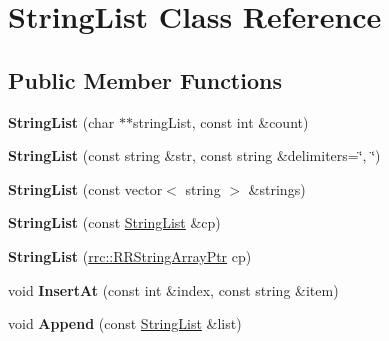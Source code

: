 \hypertarget{classrrc_1_1_string_list}{\section{String\+List Class Reference}
\label{classrrc_1_1_string_list}
}
\subsection*{Public Member Functions}
\begin{DoxyCompactItemize}
\item 
\hypertarget{classrrc_1_1_string_list_ae1e0bca30bc21edd66e7dd2b539273f4}{{\bfseries String\+List} (char $\ast$$\ast$string\+List, const int \&count)}\label{classrrc_1_1_string_list_ae1e0bca30bc21edd66e7dd2b539273f4}

\item 
\hypertarget{classrrc_1_1_string_list_a6306d63c1e79ab13cb62c1937722a06f}{{\bfseries String\+List} (const string \&str, const string \&delimiters=\char`\"{}, \char`\"{})}\label{classrrc_1_1_string_list_a6306d63c1e79ab13cb62c1937722a06f}

\item 
\hypertarget{classrrc_1_1_string_list_aec20e4743e6cebb9a3c14f04eee6ea5b}{{\bfseries String\+List} (const vector$<$ string $>$ \&strings)}\label{classrrc_1_1_string_list_aec20e4743e6cebb9a3c14f04eee6ea5b}

\item 
\hypertarget{classrrc_1_1_string_list_a2c6607735f8c410ce3ab82c1b88fc6f7}{{\bfseries String\+List} (const \hyperlink{classrrc_1_1_string_list}{String\+List} \&cp)}\label{classrrc_1_1_string_list_a2c6607735f8c410ce3ab82c1b88fc6f7}

\item 
\hypertarget{classrrc_1_1_string_list_a6dcfcea51506e87c9bbb2cf3f65751f7}{{\bfseries String\+List} (\hyperlink{rrc__types_8h_a7c9475df6c7337d99482b13a365e7596}{rrc\+::\+R\+R\+String\+Array\+Ptr} cp)}\label{classrrc_1_1_string_list_a6dcfcea51506e87c9bbb2cf3f65751f7}

\item 
\hypertarget{classrrc_1_1_string_list_ac3831ed58535977c2188dff41fbd2bcd}{void {\bfseries Insert\+At} (const int \&index, const string \&item)}\label{classrrc_1_1_string_list_ac3831ed58535977c2188dff41fbd2bcd}

\item 
\hypertarget{classrrc_1_1_string_list_aff1a1c047f187d1c50ef09f7c803d9f9}{void {\bfseries Append} (const \hyperlink{classrrc_1_1_string_list}{String\+List} \&list)}\label{classrrc_1_1_string_list_aff1a1c047f187d1c50ef09f7c803d9f9}


\end{DoxyCompactItemize}
